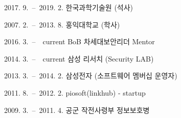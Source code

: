 \curriculumvitae[4]
		\begin{personaldata}
		 \end{personaldata}

		\begin{education}
				\item[2017. 9.\ --\ 2019. 2.] 한국과학기술원 (석사)
				\item[2007. 2.\ --\ 2013. 8.] 홍익대학교 (학사)
				
		\end{education}

		\begin{career}
				\item[2016. 3.\ --\ ~current] BoB 차세대보안리더 Mentor
				\item[2014. 3.\ --\ ~current] 삼성 리서치 (Security LAB)
				\item[2013. 3.\ --\ 2014. 2.] 삼성전자 (소프트웨어 멤버십 운영자) 
				\item[2011. 8.\ --\ 2012. 2.] piosoft(linkhub) - startup
				\item[2009. 3.\ --\ 2011. 4.] 공군 작전사령부 정보보호병
		\end{career}

